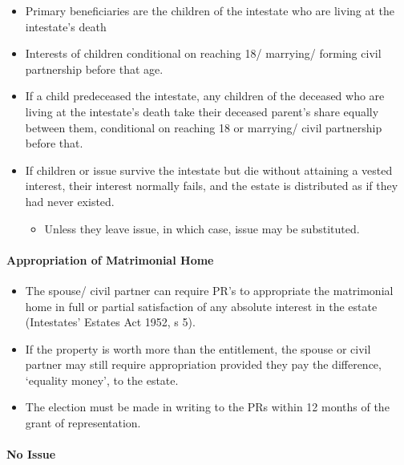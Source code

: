 \documentclass[
]{article}
\providecommand{\tightlist}{%
  \setlength{\itemsep}{0pt}\setlength{\parskip}{0pt}}
\begin{document}
\begin{itemize}
\tightlist
\item
  Primary beneficiaries are the children of the intestate who are living
  at the intestate's death
\item
  Interests of children conditional on reaching 18/ marrying/ forming
  civil partnership before that age.
\item
  If a child predeceased the intestate, any children of the deceased who
  are living at the intestate's death take their deceased parent's share
  equally between them, conditional on reaching 18 or marrying/ civil
  partnership before that.
\item
  If children or issue survive the intestate but die without attaining a
  vested interest, their interest normally fails, and the estate is
  distributed as if they had never existed.

  \begin{itemize}
  \tightlist
  \item
    Unless they leave issue, in which case, issue may be substituted.
  \end{itemize}
\end{itemize}

\hypertarget{appropriation-of-matrimonial-home}{%
\paragraph{Appropriation of Matrimonial
Home}\label{appropriation-of-matrimonial-home}}

\begin{itemize}
\tightlist
\item
  The spouse/ civil partner can require PR's to appropriate the
  matrimonial home in full or partial satisfaction of any absolute
  interest in the estate (Intestates' Estates Act 1952, s 5).
\item
  If the property is worth more than the entitlement, the spouse or
  civil partner may still require appropriation provided they pay the
  difference, `equality money', to the estate.
\item
  The election must be made in writing to the PRs within 12 months of
  the grant of representation.
\end{itemize}

\hypertarget{no-issue}{%
\paragraph{No Issue}\label{no-issue}}
\end{document}
